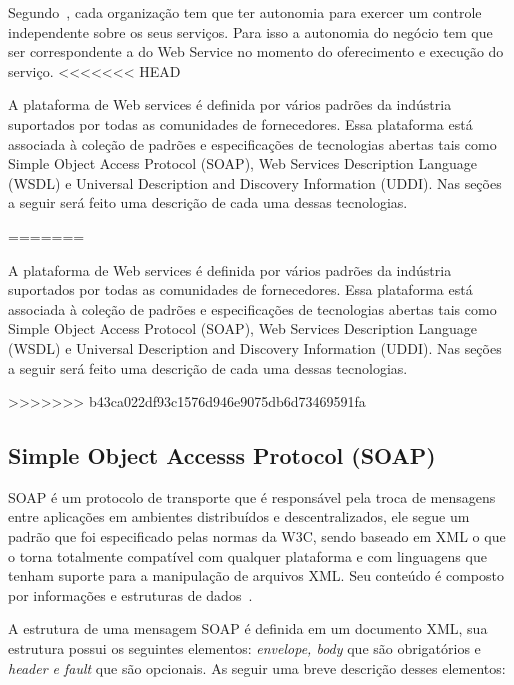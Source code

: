 Segundo~\cite{Bertino2010}, cada organização tem que ter autonomia para exercer um controle independente sobre os seus serviços. Para isso a autonomia do negócio tem que ser correspondente a do Web Service no momento do oferecimento e execução do serviço.
<<<<<<< HEAD

A plataforma de Web services é definida por vários padrões da indústria suportados por todas as comunidades de fornecedores. Essa plataforma está associada à coleção de padrões e especificações de tecnologias abertas tais como Simple Object Access Protocol (SOAP), Web Services Description Language (WSDL) e  Universal Description and Discovery Information (UDDI). Nas seções a seguir será feito uma descrição de cada uma dessas tecnologias.

=======

A plataforma de Web services é definida por vários padrões da indústria suportados por todas as comunidades de fornecedores. Essa plataforma está associada à coleção de padrões e especificações de tecnologias abertas tais como Simple Object Access Protocol (SOAP), Web Services Description Language (WSDL) e  Universal Description and Discovery Information (UDDI). Nas seções a seguir será feito uma descrição de cada uma dessas tecnologias.

>>>>>>> b43ca022df93c1576d946e9075db6d73469591fa

\subsection{Simple Object Accesss Protocol (SOAP)}
SOAP é um protocolo de transporte que é responsável pela troca de mensagens entre aplicações em ambientes distribuídos e descentralizados, ele segue um padrão que foi especificado pelas normas da W3C, sendo baseado em XML o que o torna totalmente compatível com qualquer plataforma e com linguagens que tenham suporte para a manipulação de arquivos XML. Seu conteúdo é composto por informações e estruturas de dados~\cite{COYLE}.

A estrutura de uma mensagem SOAP é definida em um documento XML, sua estrutura possui os seguintes elementos:\emph{ envelope, body} que são obrigatórios e \emph{header e fault} que são opcionais. As seguir uma breve descrição desses elementos:

